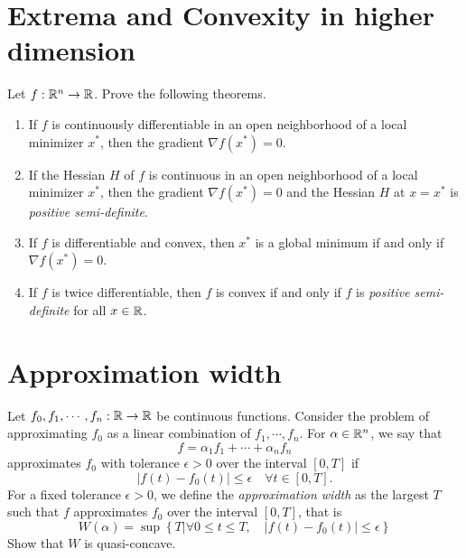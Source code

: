 \section{Extrema and Convexity in higher dimension}
Let \(f: \mathbb{R}^n \to \mathbb{R}\). Prove the following theorems.
\begin{enumerate}
	\item If \(f\) is continuously differentiable in an open neighborhood of a local minimizer \(x^*\), then the gradient \(\nabla f(x^ *) = 0\).
	\item If the Hessian \(H\) of \(f\) is continuous in an open neighborhood of a local minimizer \(x^*\), then the gradient \(\nabla f(x^ *) = 0\) and the Hessian \(H\) at \(x=x^*\) is \emph{positive semi-definite}.
	\item If \(f\) is differentiable and convex, then \(x^*\) is a global minimum if and only if \(\nabla f(x^*) = 0\).
	\item If \(f\) is twice differentiable, then \(f\) is convex if and only if \(f\) is \emph{positive semi-definite} for all \(x \in \mathbb{R}\).
\end{enumerate}


\section{Approximation width}
Let \(f_0, f_1, \cdots, f_n: \mathbb{R} \to \mathbb{R}\) be continuous functions.
Consider the problem of approximating \(f_0\) as a linear combination of \(f_1, \cdots, f_n\).
For \(\alpha\in\mathbb{R}^n\), we say that
\[ f=\alpha_1f_1+\cdots+\alpha_n f_n \]
approximates \(f_0\) with tolerance \(\epsilon > 0\) over the interval \([0, T]\) if
\[ |f(t)-f_0(t)|\leq\epsilon \quad \forall t\in[0,T]. \]
For a fixed tolerance \(\epsilon > 0\), we define the \emph{approximation width} as the largest \(T\) such that \(f\) approximates \(f_0\) over the interval \([0, T]\), that is
\[ W(\alpha) = \sup \left\{ T | \forall 0 \leq t \leq T, \quad |f(t) - f_0(t)| \leq\epsilon \right\} \]
Show that \(W\) is quasi-concave.


